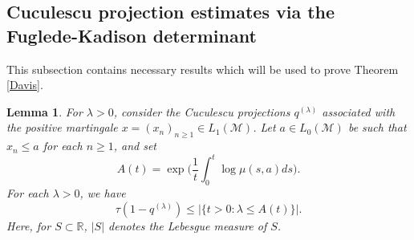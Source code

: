 \documentclass[11]{amsart}
\numberwithin{equation}{section}
\newtheorem{lemma}[theorem]{Lemma}
\begin{document}
\subsection{Cuculescu projection  estimates  via the Fuglede-Kadison determinant}


This subsection contains necessary results which will be used to prove Theorem \ref{Davis}. 

\begin{lemma}\label{key lemma}
For $\lambda>0$, consider the Cuculescu projections $q^{(\lambda)}$ associated with the positive martingale 	 $x=(x_n)_{n\geq1}\in L_1(\mathcal{M})$. 	Let $a\in L_0(\mathcal{M})$ be such that $x_n\leq a$  for each $n\geq1$, and set 
	\[A(t)=\exp\Big(\frac{1}{t}\int_0^t\log\mu(s,a)ds\Big).\]	
For each $\lambda>0$, we have
	$$\tau(1-q^{(\lambda)})\leq |\{t>0: \lambda\leq A(t)\}|.$$
	Here, for $S\subset \mathbb{R}$, $|S|$  denotes the Lebesgue measure of $S$.  
\end{lemma}
\end{document}
